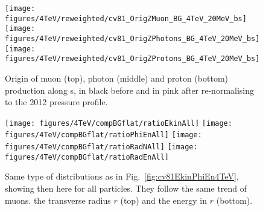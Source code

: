 \newpage



   


\begin{figure}
  
\begin{center}
  \texttt{[image: figures/4TeV/reweighted/cv81\_OrigZMuon\_BG\_4TeV\_20MeV\_bs]}
  \texttt{[image: figures/4TeV/reweighted/cv81\_OrigZPhotons\_BG\_4TeV\_20MeV\_bs]}
  \texttt{[image: figures/4TeV/reweighted/cv81\_OrigZProtons\_BG\_4TeV\_20MeV\_bs]}
\end{center}
\vspace{-0.6cm}
 \caption{Origin of muon (top), photon (middle) and proton (bottom) production along s, in black before and in pink after re-normalising to the 2012 pressure profile. 
  \label{fig:OrigZ4TeV2}}
\end{figure}

\begin{figure}
\begin{center}
   \texttt{[image: figures/4TeV/compBGflat/ratioEkinAll]}
   \texttt{[image: figures/4TeV/compBGflat/ratioPhiEnAll]}
  \texttt{[image: figures/4TeV/compBGflat/ratioRadNAll]}
  \texttt{[image: figures/4TeV/compBGflat/ratioRadEnAll]}
\end{center}
\vspace{-0.6cm}
 \caption{Same type of distributions as in Fig.~\ref{fig:cv81EkinPhiEn4TeV}, showing then here for all particles. They follow the same trend of muons. the transverse radius $r$ (top) and the energy in $r$ (bottom). 
  \label{fig:cv81EkinPhiEn4TeV2}} 
\end{figure}


